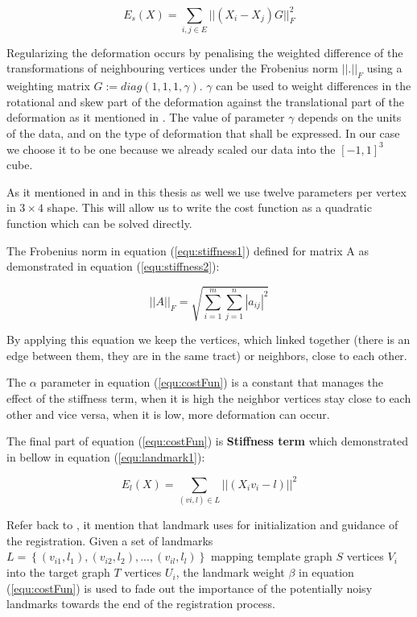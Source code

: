 \documentclass[../structure.tex]{subfiles}
\begin{document}
\begin{equation}
E_{s}(X) = \sum_{i,j \in E} ||(X_{i} - X_{j})G||_{F}^2
\label{equ:stiffness1}
\end{equation}

Regularizing the deformation occurs by penalising the weighted difference of the transformations of neighbouring vertices under the Frobenius norm $||.||_{F}$ using a weighting matrix $G := diag(1, 1, 1, \gamma)$.
$\gamma$ can be used to weight differences in the rotational and skew part of the deformation against the translational part of the deformation as it mentioned in \cite{Amberg2007}. The value of parameter $\gamma$ depends on the units of the data, and on the type of deformation that shall be expressed. In our case we choose it to be one because we already scaled our data into the $[-1, 1]^3$ cube.

As it mentioned in \cite{Amberg2007} and in this thesis as well we use twelve parameters per vertex in $3 \times 4$ shape. This will allow us to write the cost function as a quadratic function which can be solved directly.

The Frobenius norm in equation (\ref{equ:stiffness1}) defined for matrix A as demonstrated in equation (\ref{equ:stiffness2}):

\begin{equation}
||A||_{F} = \sqrt{\sum_{i=1}^m \sum_{j=1}^n |a_{ij}|^2}
\label{equ:stiffness2}
\end{equation}

By applying this equation we keep the vertices, which linked together (there is an edge between them, they are in the same tract) or neighbors, close to each other.

The $\alpha$ parameter in equation (\ref{equ:costFun}) is a constant that manages the effect of the stiffness term, when it is high the neighbor vertices stay close to each other and vice versa, when it is low, more deformation can occur.

The final part of equation (\ref{equ:costFun}) is \textbf{Stiffness term} which demonstrated in bellow in equation (\ref{equ:landmark1}):

\begin{equation}
E_{l}(X) = \sum_{(vi,l) \in L}||(X_{i}v_{i} - l)||^2
\label{equ:landmark1}
\end{equation}

Refer back to \cite{Amberg2007}, it mention that landmark uses for initialization and guidance of the registration. Given a set of landmarks $L = \left\{(v_{i1},l_{1}),(v_{i2},l_{2}),...,(v_{il},l_{l})\right\}$ mapping template graph $S$ vertices $V_{i}$ into the target graph $T$ vertices $U_{i}$, the landmark weight $\beta$ in equation (\ref{equ:costFun}) is used to fade out the importance of the potentially noisy landmarks towards the end of the registration process.
\end{document}
